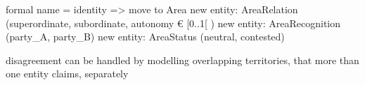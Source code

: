 formal name = identity => move to Area
new entity: AreaRelation    (superordinate, subordinate, autonomy € [0..1[ )
new entity: AreaRecognition (party\_A, party\_B)
new entity: AreaStatus      (neutral, contested)

disagreement can be handled by modelling overlapping territories, that more than one entity claims, separately






